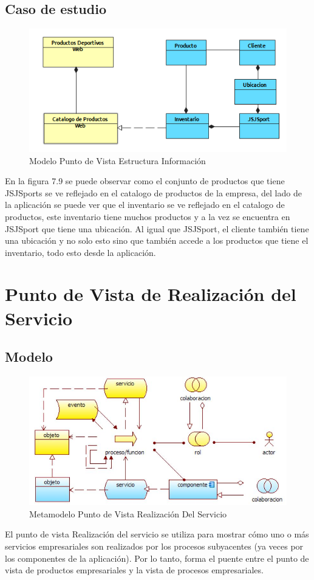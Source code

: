 \subsection{Caso de estudio}

\begin{figure}[th!]
	\centering
	\includegraphics[width=0.7\linewidth]{arquitectura/imagenes/PuntoVistaEstructuraInformacion}
	\caption{Modelo Punto de Vista Estructura Información}
	\label{modeloEstructuraInformacion}
\end{figure}

En la figura 7.9 se puede observar como el conjunto de productos que tiene JSJSports se ve reflejado en el catalogo de productos de la empresa, del lado de la aplicación se puede ver que el inventario se ve reflejado en el catalogo de productos, este inventario tiene muchos productos y a la vez se encuentra en JSJSport que tiene una ubicación.
\newline
Al igual que JSJSport, el cliente también tiene una ubicación y no solo esto sino que también accede a los productos que tiene el inventario, todo esto desde la aplicación.


\newpage

\section{Punto de Vista de Realización del Servicio}

\subsection{Modelo}

\begin{figure}[th!]
	\centering
	\includegraphics[width=0.7\linewidth]{arquitectura/imagenes/modeloRealizacionServicio}
	\caption{Metamodelo Punto de Vista Realización Del Servicio}
	\label{metamodeloRealizacionServicio}
\end{figure}
El punto de vista Realización del servicio se utiliza para mostrar cómo uno o más servicios empresariales son realizados por los procesos subyacentes (ya veces por los componentes de la aplicación). Por lo tanto, forma el puente entre el punto de vista de productos empresariales y la vista de procesos empresariales. 


